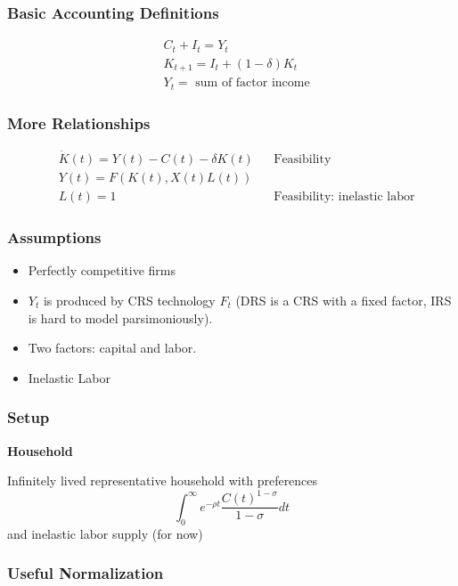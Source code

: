 \documentclass[10pt]{article}
\begin{document}
\subsubsection{Basic Accounting Definitions}

\begin{align}
    &C_t+I_t=Y_t \\
    &K_{t+1}=I_t+(1-\delta) K_t\\
    &\text{$Y_t=$ sum of factor income}
\end{align}

\subsubsection{More Relationships}

\begin{align}
    &\dot{K}(t)=Y(t)-C(t)-\delta K(t) && \text{Feasibility}\\
    &Y(t)=F(K(t), X(t) L(t)) \\
    &L(t) =1 && \text{Feasibility: inelastic labor}
\end{align}

\subsubsection{Assumptions}

\begin{itemize}
    \item Perfectly competitive firms
    \item $Y_t$ is produced by CRS technology $F_t$ (DRS is a CRS with a fixed factor, IRS is hard to model parsimoniously).
    \item Two factors: capital and labor.
    \item Inelastic Labor
\end{itemize}

\subsubsection{Setup}

\textbf{Household}

Infinitely lived representative household with preferences
$$
\int_0^{\infty} e^{-\rho t} \frac{C(t)^{1-\sigma}}{1-\sigma} d t
$$
and inelastic labor supply (for now)

\subsubsection{Useful Normalization}
\end{document}
